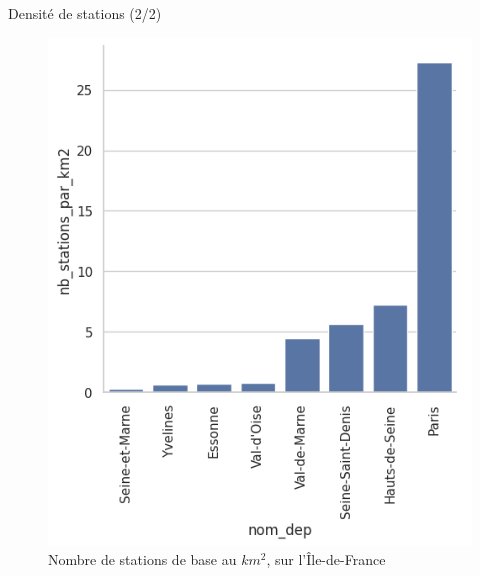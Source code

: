 \begin{frame}{Densité de stations (2/2)}
    \begin{figure}
        \includegraphics[height=0.55\paperheight]{images/barplots/densite_station_par_dep_IDF.png}
        \caption{\label{fig:densite_stat_IDF}Nombre de stations de base au $\unit{km^2}$, sur l'Île-de-France}
    \end{figure}
\end{frame}